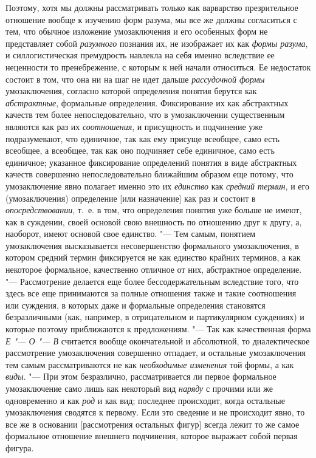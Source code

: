 {{Поэтому, хотя мы должны рассматривать только как варварство
презрительное отношение вообще к изучению форм разума, мы все же должны
согласиться с тем, что обычное изложение умозаключения и его особенных форм
не представляет собой {\em разумного}
познания их, не изображает их как
{\em формы разума}, и
силлогистическая премудрость навлекла на себя именно вследствие ее
неценности то пренебрежение, с которым к ней начали относиться. Ее
недостаток состоит в том, что она ни на шаг не идет дальше
{\em рассудочной формы}
умозаключения, согласно которой определения понятия берутся
как {\em абстрактные},
формальные определения. Фиксирование их как абстрактных
качеств тем более непоследовательно, что в умозаключении существенным
являются как раз их {\em соотношения},
и присущность и подчинение уже подразумевают, что единичное,
так как ему присуще всеобщее, само есть всеобщее, а всеобщее, так как оно
подчиняет себе единичное, само есть единичное; указанное фиксирование
определений понятия в виде абстрактных качеств совершенно непоследовательно
ближайшим образом еще потому, что умозаключение явно полагает именно это их
{\em единство} как
{\em средний термин}, и
его (умозаключения) определение [или назначение] как раз и состоит в
{\em опосредствовании},
т.~е. в том, что определения понятия уже больше не имеют, как
в суждении, своей основой свою внешность по отношению друг к другу, а,
наоборот, имеют основой свое единство. "--- Тем самым, понятием
умозаключения высказывается несовершенство формального умозаключения, в
котором средний термин фиксируется не как единство крайних терминов, а как
некоторое формальное, качественно отличное от них, абстрактное
определение. "--- Рассмотрение делается еще более
бессодержательным вследствие того, что здесь все еще принимаются за полные
отношения также и такие соотношения или суждения, в которых даже и
формальные определения становятся безразличными (как, например, в
отрицательном и партикулярном суждениях) и которые поэтому приближаются к
предложениям. "--- Так как качественная форма
{\em Е "--- О "--- В} считается вообще окончательной и
абсолютной, то диалектическое рассмотрение умозаключения совершенно
отпадает, и остальные умозаключения тем самым рассматриваются не как
{\em необходимые изменения}
той формы, а как
{\em виды}. "--- При этом
безразлично, рассматривается ли первое формальное умозаключение само лишь
как некоторый вид {\em наряду}
с прочими или же одновременно и как
{\em род} и как вид;
последнее происходит, когда остальные умозаключения сводятся к первому.
Если это сведение и не происходит явно, то все же в основании [рассмотрения
остальных фигур] всегда лежит то же самое формальное отношение внешнего
подчинения, которое выражает собой первая фигура.

}}
